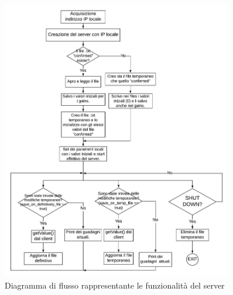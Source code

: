 \chapter{}
\label{cod:Appendice_opcua}
\begin{figure}[h]
	\centering   	
	\includegraphics[width=0.9\textwidth]{Immagini/OPCUA_diagram.jpeg}
	\caption{Diagramma di flusso rappresentante le funzionalità del server}
	\label{fig:OPCUA_diagram}
\end{figure}

\newpage
